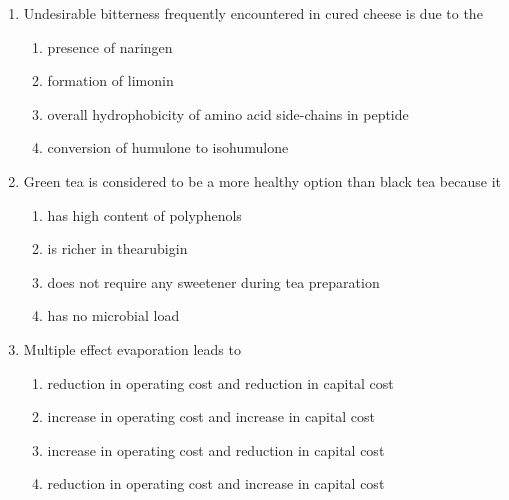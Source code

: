 \documentclass[journal,12pt,onecolumn]{IEEEtran}
\begin{document}
\begin{enumerate}[label=\arabic*)]
\vspace{0.5cm}

\item Undesirable bitterness frequently encountered in cured cheese is due to the
\hfill{} \\

\vspace{0.2cm}
\begin{enumerate}[label=\alph*)]
\item presence of naringen
\item formation of limonin
\item overall hydrophobicity of amino acid side-chains in peptide
\item conversion of humulone to isohumulone
\end{enumerate}

\vspace{0.5cm}

\item Green tea is considered to be a more healthy option than black tea because it
\hfill{} \\

\vspace{0.2cm}
\begin{enumerate}[label=\alph*)]
\item has high content of polyphenols
\item is richer in thearubigin
\item does not require any sweetener during tea preparation
\item has no microbial load
\end{enumerate}

\vspace{0.5cm}

\item Multiple effect evaporation leads to
\hfill{} \\

\vspace{0.2cm}
\begin{enumerate}[label=\alph*)]
\item reduction in operating cost and reduction in capital cost
\item increase in operating cost and increase in capital cost
\item increase in operating cost and reduction in capital cost
\item reduction in operating cost and increase in capital cost
\end{enumerate}


\end{enumerate}
\end{document}
